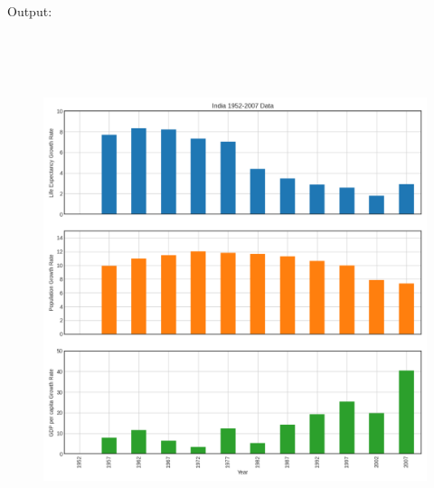 \documentclass[a4paper,11pt,openright]{report}
\begin{document}
\begin{enumerate}
Output:
\begin{figure}[ht!]
\includegraphics[width=30cm,height=15cm,keepaspectratio]{grate.pdf}
\centering
\end{figure}

\end{enumerate}
\end{document}
